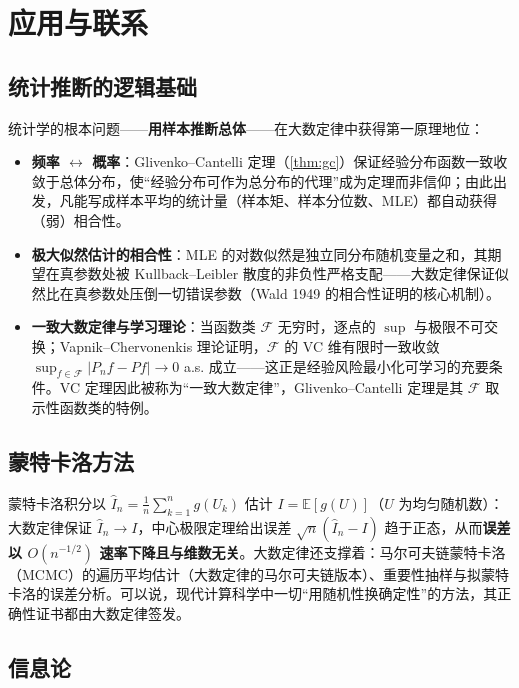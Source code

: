 \section{应用与联系}\label{sec:applications}

\subsection{统计推断的逻辑基础}

统计学的根本问题——\textbf{用样本推断总体}——在大数定律中获得第一原理地位：

\begin{itemize}
    \item \textbf{频率 $\leftrightarrow$ 概率}：Glivenko--Cantelli 定理（\cref{thm:gc}）保证经验分布函数一致收敛于总体分布，使“经验分布可作为总分布的代理”成为定理而非信仰；由此出发，凡能写成样本平均的统计量（样本矩、样本分位数、MLE）都自动获得（弱）相合性。
    \item \textbf{极大似然估计的相合性}：MLE 的对数似然是独立同分布随机变量之和，其期望在真参数处被 Kullback--Leibler 散度的非负性严格支配——大数定律保证似然比在真参数处压倒一切错误参数（Wald 1949 的相合性证明的核心机制）。
    \item \textbf{一致大数定律与学习理论}：当函数类 $\mathcal{F}$ 无穷时，逐点的 $\sup$ 与极限不可交换；Vapnik--Chervonenkis 理论证明，$\mathcal{F}$ 的 VC 维有限时一致收敛 $\sup_{f \in \mathcal{F}} |P_n f - Pf| \to 0$ a.s. 成立——这正是经验风险最小化可学习的充要条件。VC 定理因此被称为“一致大数定律”，Glivenko--Cantelli 定理是其 $\mathcal{F}$ 取示性函数类的特例。
\end{itemize}

\subsection{蒙特卡洛方法}

蒙特卡洛积分以 $\hat{I}_n = \frac{1}{n}\sum_{k=1}^n g(U_k)$ 估计 $I = \mathbb{E}[g(U)]$（$U$ 为均匀随机数）：大数定律保证 $\hat{I}_n \to I$，中心极限定理给出误差 $\sqrt{n}(\hat{I}_n - I)$ 趋于正态，从而\textbf{误差以 $O(n^{-1/2})$ 速率下降且与维数无关}。大数定律还支撑着：马尔可夫链蒙特卡洛（MCMC）的遍历平均估计（大数定律的马尔可夫链版本）、重要性抽样与拟蒙特卡洛的误差分析。可以说，现代计算科学中一切“用随机性换确定性”的方法，其正确性证书都由大数定律签发。

\subsection{信息论}

